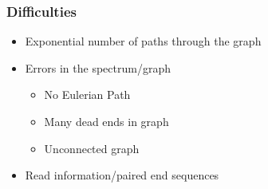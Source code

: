 \documentclass[10pt]{article}
\begin{document}
\subsubsection*{Difficulties}
\begin{itemize}
    \item Exponential number of paths through the graph
    \item Errors in the spectrum/graph
    \begin{itemize}
        \item No Eulerian Path
        \item Many dead ends in graph
        \item Unconnected graph
    \end{itemize}
    \item Read information/paired end sequences
\end{itemize}
\end{document}
